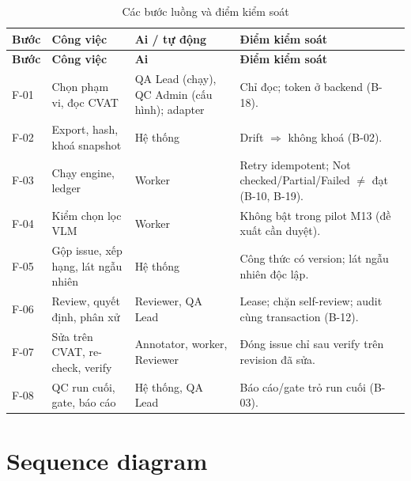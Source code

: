 \begin{xltabular}{\linewidth}{@{}L{1.2cm}L{3.5cm}L{3cm}Y@{}}
\caption{Các bước luồng và điểm kiểm soát}\label{tab:flowsteps}\\
\toprule
\textbf{Bước} & \textbf{Công việc} & \textbf{Ai / tự động} & \textbf{Điểm kiểm soát}\\
\midrule
\endfirsthead
\toprule \textbf{Bước} & \textbf{Công việc} & \textbf{Ai} & \textbf{Điểm kiểm soát}\\ \midrule
\endhead
\bottomrule
\endfoot
F-01 & Chọn phạm vi, đọc CVAT & QA Lead (chạy), QC Admin (cấu hình); adapter & Chỉ đọc; token ở backend (B-18).\\
F-02 & Export, hash, khoá snapshot & Hệ thống & Drift $\Rightarrow$ không khoá (B-02).\\
F-03 & Chạy engine, ledger & Worker & Retry idempotent; Not checked/Partial/Failed $\ne$ đạt (B-10, B-19).\\
F-04 & Kiểm chọn lọc VLM & Worker & Không bật trong pilot M13 (đề xuất cần duyệt).\\
F-05 & Gộp issue, xếp hạng, lát ngẫu nhiên & Hệ thống & Công thức có version; lát ngẫu nhiên độc lập.\\
F-06 & Review, quyết định, phân xử & Reviewer, QA Lead & Lease; chặn self-review; audit cùng transaction (B-12).\\
F-07 & Sửa trên CVAT, re-check, verify & Annotator, worker, Reviewer & Đóng issue chỉ sau verify trên revision đã sửa.\\
F-08 & QC run cuối, gate, báo cáo & Hệ thống, QA Lead & Báo cáo/gate trỏ run cuối (B-03).\\
\end{xltabular}


\section{Sequence diagram}
\label{sec:sequence}

